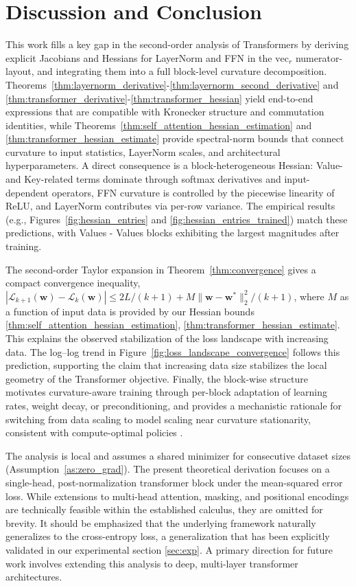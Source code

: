 \documentclass{article}
\begin{document}
\section{Discussion and Conclusion}\label{sec:disc}

This work fills a key gap in the second-order analysis of Transformers by deriving explicit Jacobians and Hessians for LayerNorm and FFN in the $\mathrm{vec}_r$ numerator-layout, and integrating them into a full block-level curvature decomposition. Theorems~\ref{thm:layernorm_derivative}-\ref{thm:layernorm_second_derivative} and \ref{thm:transformer_derivative}-\ref{thm:transformer_hessian} yield end-to-end expressions that are compatible with Kronecker structure and commutation identities, while Theorems~\ref{thm:self_attention_hessian_estimation} and \ref{thm:transformer_hessian_estimate} provide spectral-norm bounds that connect curvature to input statistics, LayerNorm scales, and architectural hyperparameters. A direct consequence is a block-heterogeneous Hessian: Value- and Key-related terms dominate through softmax derivatives and input-dependent operators, FFN curvature is controlled by the piecewise linearity of ReLU, and LayerNorm contributes via per-row variance. The empirical results (e.g., Figures~\ref{fig:hessian_entries} and \ref{fig:hessian_entries_trained}) match these predictions, with Values - Values blocks exhibiting the largest magnitudes after training.

The second-order Taylor expansion in Theorem~\ref{thm:convergence} gives a compact convergence inequality, $|\mathcal{L}_{k+1}(\mathbf{w})-\mathcal{L}_{k}(\mathbf{w})| \le 2L/(k+1) + M\|\mathbf{w}-\mathbf{w}^*\|_2^2/(k+1)$, where $M$ as a function of input data is provided by our Hessian bounds \ref{thm:self_attention_hessian_estimation}, \ref{thm:transformer_hessian_estimate}. This explains the observed stabilization of the loss landscape with increasing data. The log–log trend in Figure~\ref{fig:loss_landscape_convergence} follows this prediction, supporting the claim that increasing data size stabilizes the local geometry of the Transformer objective. Finally, the block-wise structure motivates curvature-aware training through per-block adaptation of learning rates, weight decay, or preconditioning, and provides a mechanistic rationale for switching from data scaling to model scaling near curvature stationarity, consistent with compute-optimal policies \cite{kaplan2020scaling,hoffmann2022training}.

The analysis is local and assumes a shared minimizer for consecutive dataset sizes (Assumption~\ref{as:zero_grad}). The present theoretical derivation focuses on a single-head, post-normalization transformer block under the mean-squared error loss. While extensions to multi-head attention, masking, and positional encodings are technically feasible within the established calculus, they are omitted for brevity. It should be emphasized that the underlying framework naturally generalizes to the cross-entropy loss, a generalization that has been explicitly validated in our experimental section \ref{sec:exp}. A primary direction for future work involves extending this analysis to deep, multi-layer transformer architectures.
\end{document}
